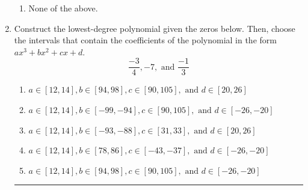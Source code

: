 \documentclass[14pt]{extbook}
\newcommand{\litem}[1]{\item#1\hspace*{-1cm}\rule{\textwidth}{0.4pt}}
\begin{document}
\begin{enumerate}
{\begin{enumerate}[label=\Alph*.]
\item None of the above.
\end{enumerate} }
\litem{
Construct the lowest-degree polynomial given the zeros below. Then, choose the intervals that contain the coefficients of the polynomial in the form $ax^3+bx^2+cx+d$.\[ \frac{-3}{4}, -7, \text{ and } \frac{-1}{3} \]\begin{enumerate}[label=\Alph*.]
\item \( a \in [12, 14], b \in [94, 98], c \in [90, 105], \text{ and } d \in [20, 26] \)
\item \( a \in [12, 14], b \in [-99, -94], c \in [90, 105], \text{ and } d \in [-26, -20] \)
\item \( a \in [12, 14], b \in [-93, -88], c \in [31, 33], \text{ and } d \in [20, 26] \)
\item \( a \in [12, 14], b \in [78, 86], c \in [-43, -37], \text{ and } d \in [-26, -20] \)
\item \( a \in [12, 14], b \in [94, 98], c \in [90, 105], \text{ and } d \in [-26, -20] \)


\end{enumerate}}
\end{enumerate}
\end{document}

